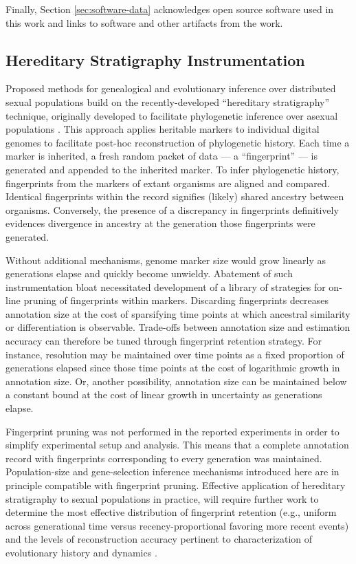Finally, Section \ref{sec:software-data} acknowledges open source software used in this work and links to software and other artifacts from the work.

\subsection{Hereditary Stratigraphy Instrumentation}
\label{sec:instrumentation}

Proposed methods for genealogical and evolutionary inference over distributed sexual populations build on the recently-developed ``hereditary stratigraphy'' technique, originally developed to facilitate phylogenetic inference over asexual populations \citep{moreno2022hstrat}.
This approach applies heritable markers to individual digital genomes to facilitate post-hoc reconstruction of phylogenetic history.
Each time a marker is inherited, a fresh random packet of data --- a ``fingerprint'' --- is generated and appended to the inherited marker.
To infer phylogenetic history, fingerprints from the markers of extant organisms are aligned and compared.
Identical fingerprints within the record signifies (likely) shared ancestry between organisms.
Conversely, the presence of a discrepancy in fingerprints definitively evidences divergence in ancestry at the generation those fingerprints were generated.

Without additional mechanisms, genome marker size would grow linearly as generations elapse and quickly become unwieldy.
Abatement of such instrumentation bloat necessitated development of a library of strategies for on-line pruning of fingerprints within markers.
Discarding fingerprints decreases annotation size at the cost of sparsifying time points at which  ancestral similarity or differentiation is observable.
Trade-offs between annotation size and estimation accuracy can therefore be tuned through fingerprint retention strategy.
For instance, resolution may be maintained over time points as a fixed proportion of generations elapsed since those time points at the cost of logarithmic growth in annotation size.
Or, another possibility, annotation size can be maintained below a constant bound at the cost of linear growth in uncertainty as generations elapse.

Fingerprint pruning was not performed in the reported experiments in order to simplify experimental setup and analysis.
This means that a complete annotation record with fingerprints corresponding to every generation was maintained.
Population-size and gene-selection inference mechanisms introduced here are in principle compatible with fingerprint pruning.
Effective application of hereditary stratigraphy to sexual populations in practice, will require further work to determine the most effective distribution of fingerprint retention (e.g., uniform across generational time versus recency-proportional favoring more recent events) and the levels of reconstruction accuracy pertinent to characterization of evolutionary history and dynamics \citep{moreno2023toward}.


